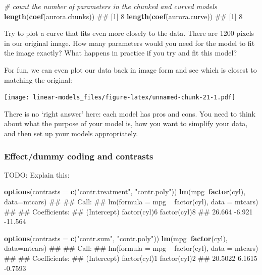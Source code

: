 \documentclass[]{article}
\newenvironment{Shaded}{\begin{snugshade}}{\end{snugshade}}
\newcommand{\KeywordTok}[1]{\textcolor[rgb]{0.13,0.29,0.53}{\textbf{#1}}}
\newcommand{\DataTypeTok}[1]{\textcolor[rgb]{0.13,0.29,0.53}{#1}}
\newcommand{\StringTok}[1]{\textcolor[rgb]{0.31,0.60,0.02}{#1}}
\newcommand{\CommentTok}[1]{\textcolor[rgb]{0.56,0.35,0.01}{\textit{#1}}}
\newcommand{\OperatorTok}[1]{\textcolor[rgb]{0.81,0.36,0.00}{\textbf{#1}}}
\newcommand{\NormalTok}[1]{#1}
\theoremstyle{definition}
\theoremstyle{definition}
\theoremstyle{definition}
\theoremstyle{remark}
\begin{document}
\begin{Shaded}
\begin{Highlighting}[]
\CommentTok{# count the number of parameters in the chunked and curved models}
\KeywordTok{length}\NormalTok{(}\KeywordTok{coef}\NormalTok{(aurora.chunks))}
\NormalTok{## [1] 8}
\KeywordTok{length}\NormalTok{(}\KeywordTok{coef}\NormalTok{(aurora.curve))}
\NormalTok{## [1] 8}
\end{Highlighting}
\end{Shaded}

{Try to plot a curve that fits even more closely to the data. There are
1200 pixels in our original image. How many parameters would you need
for the model to fit the image exactly? What happens in practice if you
try and fit this model?}

For fun, we can even plot our data back in image form and see which is
closest to matching the original:

\texttt{[image: linear-models\_files/figure-latex/unnamed-chunk-21-1.pdf]}

{There is no `right answer' here: each model has pros and cons. You need
to think about what the purpose of your model is, how you want to
simplify your data, and then set up your models appropriately.}

\hypertarget{regression-coding}{\subsubsection*{Effect/dummy coding and
contrasts}\label{regression-coding}}

TODO: Explain this:

\begin{Shaded}
\begin{Highlighting}[]
\KeywordTok{options}\NormalTok{(}\DataTypeTok{contrasts =} \KeywordTok{c}\NormalTok{(}\StringTok{"contr.treatment"}\NormalTok{, }\StringTok{"contr.poly"}\NormalTok{))}
\KeywordTok{lm}\NormalTok{(mpg}\OperatorTok{~}\KeywordTok{factor}\NormalTok{(cyl), }\DataTypeTok{data=}\NormalTok{mtcars)}
\NormalTok{## }
\NormalTok{## Call:}
\NormalTok{## lm(formula = mpg ~ factor(cyl), data = mtcars)}
\NormalTok{## }
\NormalTok{## Coefficients:}
\NormalTok{##  (Intercept)  factor(cyl)6  factor(cyl)8  }
\NormalTok{##       26.664        -6.921       -11.564}

\KeywordTok{options}\NormalTok{(}\DataTypeTok{contrasts =} \KeywordTok{c}\NormalTok{(}\StringTok{"contr.sum"}\NormalTok{, }\StringTok{"contr.poly"}\NormalTok{))}
\KeywordTok{lm}\NormalTok{(mpg}\OperatorTok{~}\KeywordTok{factor}\NormalTok{(cyl), }\DataTypeTok{data=}\NormalTok{mtcars)}
\NormalTok{## }
\NormalTok{## Call:}
\NormalTok{## lm(formula = mpg ~ factor(cyl), data = mtcars)}
\NormalTok{## }
\NormalTok{## Coefficients:}
\NormalTok{##  (Intercept)  factor(cyl)1  factor(cyl)2  }
\NormalTok{##      20.5022        6.1615       -0.7593}
\end{Highlighting}
\end{Shaded}
\end{document}
